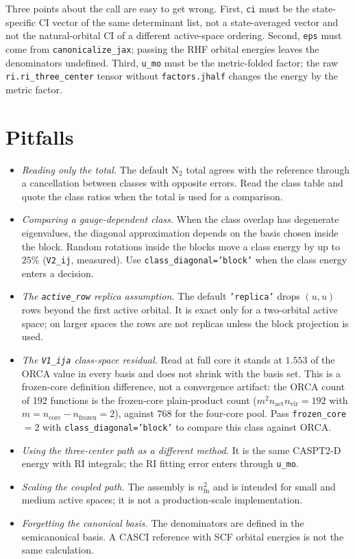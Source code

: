 Three points about the call are easy to get wrong.  First,
\texttt{ci} must be the state-specific CI vector of the same determinant
list, not a state-averaged vector and not the natural-orbital CI of a
different active-space ordering.  Second, \texttt{eps} must come from
\texttt{canonicalize\_jax}; passing the RHF orbital energies leaves the
denominators undefined.  Third, \texttt{u\_mo} must be the
metric-folded factor; the raw \texttt{ri.ri\_three\_center} tensor
without \texttt{factors.jhalf} changes the energy by the metric factor.

\section{Pitfalls}
\label{sec:caspt2-limits}

\begin{itemize}
\item \emph{Reading only the total.}  The default N$_2$ total agrees
  with the reference through a cancellation between classes with
  opposite errors.  Read the class table and quote the class ratios
  when the total is used for a comparison.
\item \emph{Comparing a gauge-dependent class.}  When the class overlap
  has degenerate eigenvalues, the diagonal approximation depends on the
  basis chosen inside the block.  Random rotations inside the blocks
  move a class energy by up to $25\%$ (\texttt{V2\_ij}, measured).  Use
  \texttt{class\_diagonal='block'} when the class energy enters a
  decision.
\item \emph{The \texttt{active\_row} replica assumption.}  The default
  \texttt{'replica'} drops $(u,u)$ rows beyond the first active orbital.
  It is exact only for a two-orbital active space; on larger spaces the
  rows are not replicas unless the block projection is used.
\item \emph{The \texttt{V1\_ija} class-space residual.}  Read at full
  core it stands at $1.553$ of the ORCA value in every basis and does
  not shrink with the basis set.  This is a frozen-core definition
  difference, not a convergence artifact: the ORCA count of 192
  functions is the frozen-core plain-product count
  ($m^{2}n_{\mathrm{act}}n_{\mathrm{vir}}=192$ with
  $m=n_{\mathrm{core}}-n_{\mathrm{frozen}}=2$), against $768$ for the
  four-core pool.  Pass \texttt{frozen\_core}$=2$ with
  \texttt{class\_diagonal='block'} to compare this class against ORCA.
\item \emph{Using the three-center path as a different method.}  It is
  the same CASPT2-D energy with RI integrals; the RI fitting error
  enters through \texttt{u\_mo}.
\item \emph{Scaling the coupled path.}  The assembly is
  $n_{\mathrm{fn}}^2$ and is intended for small and medium active
  spaces; it is not a production-scale implementation.
\item \emph{Forgetting the canonical basis.}  The denominators are
  defined in the semicanonical basis.  A CASCI reference with SCF
  orbital energies is not the same calculation.
\end{itemize}

